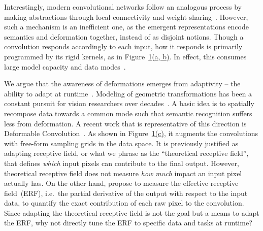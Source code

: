 \documentclass{article} \usepackage{iclr2020_conference, times}
\begin{document}
Interestingly, modern convolutional networks follow an analogous process by
making abstractions through local connectivity and weight
sharing~\citep{zhang2019making}.  However, such a mechanism is an inefficient
one, as the emergent representations encode semantics and deformation together,
instead of as disjoint notions.  Though a convolution responds accordingly to
each input, how it responds is primarily programmed by its rigid kernels, as in
Figure~\hyperref[fig:teaser]{1(a, b)}.  In effect, this consumes large model
capacity and data modes~\citep{shelhamer2019blurring}.

We argue that the awareness of deformations emerges from adaptivity -- the
ability to adapt at
runtime~\citep{kanazawa2014locally,jia2016dynamic,li2019selective}.
Modeling of geometric transformations has been a constant
pursuit for vision researchers over
decades~\citep{lowe1999object,lazebnik2006beyond,jaderberg2015spatial,dai2017deformable}.
A basic idea is to spatially recompose data towards a common mode such that semantic
recognition suffers less from deformation.
A recent work that is representative of this direction is Deformable Convolution~\citep{dai2017deformable,zhu2019deformable}.
As shown in Figure~\hyperref[fig:teaser]{1(c)}, it augments the convolutions
with free-form sampling grids in the data space.
It is previously justified as adapting receptive field, or what we phrase as
the ``theoretical receptive field'', that defines \textit{which} input pixels
can contribute to the final output.
However, theoretical receptive field does not measure \textit{how much} impact
an input pixel actually has.
On the other hand, \citet{luo2016understanding} propose to measure the effective
receptive field~(ERF), i.e.\ the partial derivative of the output with respect to the
input data, to quantify the exact contribution of each raw pixel to the
convolution.
Since adapting the theoretical receptive field is not the goal but a means to adapt
the ERF, why not directly tune the ERF to specific data and tasks at runtime?
\end{document}
